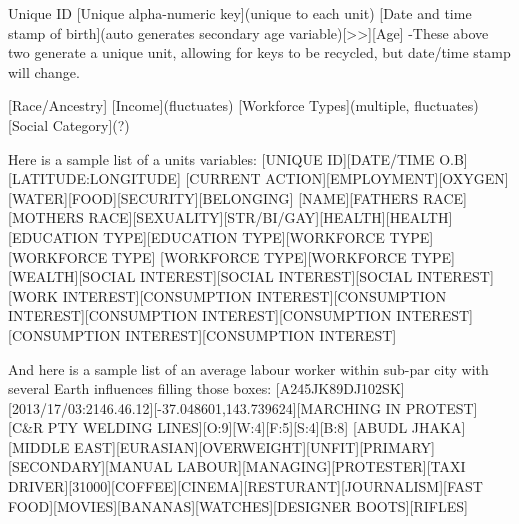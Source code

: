 
Unique ID
[Unique alpha-numeric key](unique to each unit)
[Date and time stamp of birth](auto generates secondary age variable)[>>][Age]
-These above two generate a unique unit, allowing for keys to be recycled, but date/time stamp will change.

[Race/Ancestry]
[Income](fluctuates)
[Workforce Types](multiple, fluctuates)
[Social Category](?)


Here is a sample list of a units variables:
[UNIQUE ID][DATE/TIME O.B][LATITUDE:LONGITUDE]
[CURRENT ACTION][EMPLOYMENT][OXYGEN][WATER][FOOD][SECURITY][BELONGING]
[NAME][FATHERS RACE][MOTHERS RACE][SEXUALITY][STR/BI/GAY][HEALTH][HEALTH][EDUCATION TYPE][EDUCATION TYPE][WORKFORCE TYPE][WORKFORCE TYPE]
[WORKFORCE TYPE][WORKFORCE TYPE][WEALTH][SOCIAL INTEREST][SOCIAL INTEREST][SOCIAL INTEREST][WORK INTEREST][CONSUMPTION INTEREST][CONSUMPTION INTEREST][CONSUMPTION INTEREST][CONSUMPTION INTEREST][CONSUMPTION INTEREST][CONSUMPTION INTEREST]

And here is a sample list of an average labour worker within sub-par city with several Earth influences filling those boxes:
[A245JK89DJ102SK][2013/17/03:2146.46.12][-37.048601,143.739624][MARCHING IN PROTEST][C&R PTY WELDING LINES][O:9][W:4][F:5][S:4][B:8]
[ABUDL JHAKA][MIDDLE EAST][EURASIAN][OVERWEIGHT][UNFIT][PRIMARY][SECONDARY][MANUAL LABOUR][MANAGING][PROTESTER][TAXI DRIVER][31000][COFFEE][CINEMA][RESTURANT][JOURNALISM][FAST FOOD][MOVIES][BANANAS][WATCHES][DESIGNER BOOTS][RIFLES]



